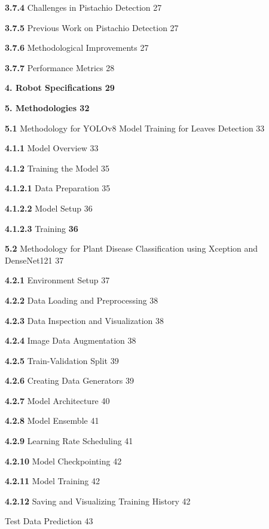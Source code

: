 \documentclass{book} %
\begin{document}
\textbf{  3.7.4 }Challenges in Pistachio Detection              27

\textbf{  3.7.5 }Previous Work on Pistachio Detection              27

\textbf{  3.7.6 }Methodological Improvements               27

\textbf{  3.7.7 }Performance Metrics                28

\noindent \textbf{4. Robot Specifications                 29}

\noindent \textbf{5.  Methodologies                    32}

\textbf{ 5.1 }Methodology for YOLOv8 Model Training for Leaves Detection          33

\textbf{  4.1.1 }Model Overview               33

\textbf{  4.1.2 }Training the Model                 35

\textbf{   4.1.2.1 }Data Preparation                 35

\textbf{   4.1.2.2 }Model Setup                 36

\textbf{   4.1.2.3 }Training               \textbf{36}

\textbf{ 5.2 }Methodology for Plant Disease Classification using Xception and DenseNet121     37

\textbf{  4.2.1 }Environment Setup           37

\textbf{  4.2.2 }Data Loading and Preprocessing         38

\textbf{  4.2.3 }Data Inspection and Visualization         38

\textbf{  4.2.4 }Image Data Augmentation          38

\textbf{  4.2.5 }Train-Validation Split           39

\textbf{  4.2.6 }Creating Data Generators          39

\textbf{  4.2.7 }Model Architecture           40

\textbf{  4.2.8 }Model Ensemble           41

\textbf{4.2.9 }Learning Rate Scheduling          41

\textbf{  4.2.10 }Model Checkpointing           42

\textbf{  4.2.11 }Model Training                      42

\textbf{  4.2.12 }Saving and Visualizing Training History        42


{ Test Data Prediction           43}

\noindent 
\end{document}
